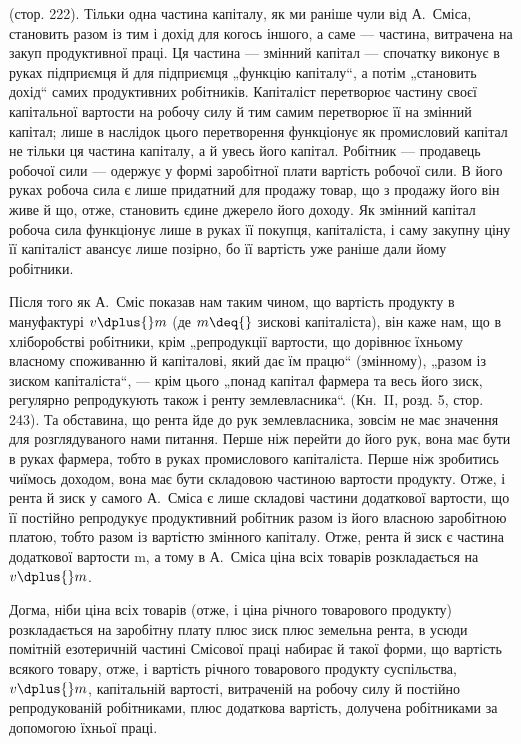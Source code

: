 \parcont{}  %
 (стор. 222). Тільки одна частина капіталу, як ми
раніше чули від А.~Сміса, становить разом із тим і дохід для когось
іншого, а саме — частина, витрачена на закуп продуктивної праці. Ця частина
— змінний капітал — спочатку виконує в руках підприємця й для підприємця
„функцію капіталу“, а потім „становить дохід“ самих продуктивних
робітників. Капіталіст перетворює частину своєї капітальної вартости на
робочу силу й тим самим перетворює її на змінний капітал; лише в наслідок
цього перетворення функціонує як промисловий капітал не тільки ця частина
капіталу, а й увесь його капітал. Робітник — продавець робочої сили — одержує
у формі заробітної плати вартість робочої сили. В його руках робоча
сила є лише придатний для продажу товар, що з продажу його він живе
й що, отже, становить єдине джерело його доходу. Як змінний капітал
робоча сила функціонує лише в руках її покупця, капіталіста, і саму
закупну ціну її капіталіст авансує лише позірно, бо її вартість уже раніше
дали йому робітники.

Після того як А.~Сміс показав нам таким чином, що вартість продукту
в мануфактурі \deq{} $v \dplus{} m$ (де $m \deq{}$ зискові капіталіста), він каже нам,
що в хліборобстві робітники, крім „репродукції вартости, що дорівнює
їхньому власному споживанню й капіталові, який дає їм працю“ (змінному),
„разом із зиском капіталіста“, — крім цього „понад капітал фармера
та весь його зиск, регулярно репродукують також і ренту землевласника“.
(Кн.~II, розд. 5, стор. 243). Та обставина, що рента
йде до рук землевласника, зовсім не має значення для розглядуваного
нами питання. Перше ніж перейти до його рук, вона має бути в
руках фармера, тобто в руках промислового капіталіста. Перше ніж зробитись
чиїмось доходом, вона має бути складовою частиною вартости
продукту. Отже, і рента й зиск у самого А.~Сміса є лише складові частини
додаткової вартости, що її постійно репродукує продуктивний робітник
разом із його власною заробітною платою, тобто разом із вартістю
змінного капіталу. Отже, рента й зиск є частина додаткової вартости
m, а тому в А.~Сміса ціна всіх товарів розкладається на $v \dplus{} m$.

Догма, ніби ціна всіх товарів (отже, і ціна річного товарового продукту)
розкладається на заробітну плату плюс зиск плюс земельна рента, в
усюди помітній езотеричній частині Смісової праці набирає й такої форми,
що вартість всякого товару, отже, і вартість річного товарового продукту
суспільства, \deq{} $v \dplus{} m$, \deq{} капітальній вартості, витраченій на робочу силу
й постійно репродукованій робітниками, плюс додаткова вартість, долучена
робітниками за допомогою їхньої праці.

